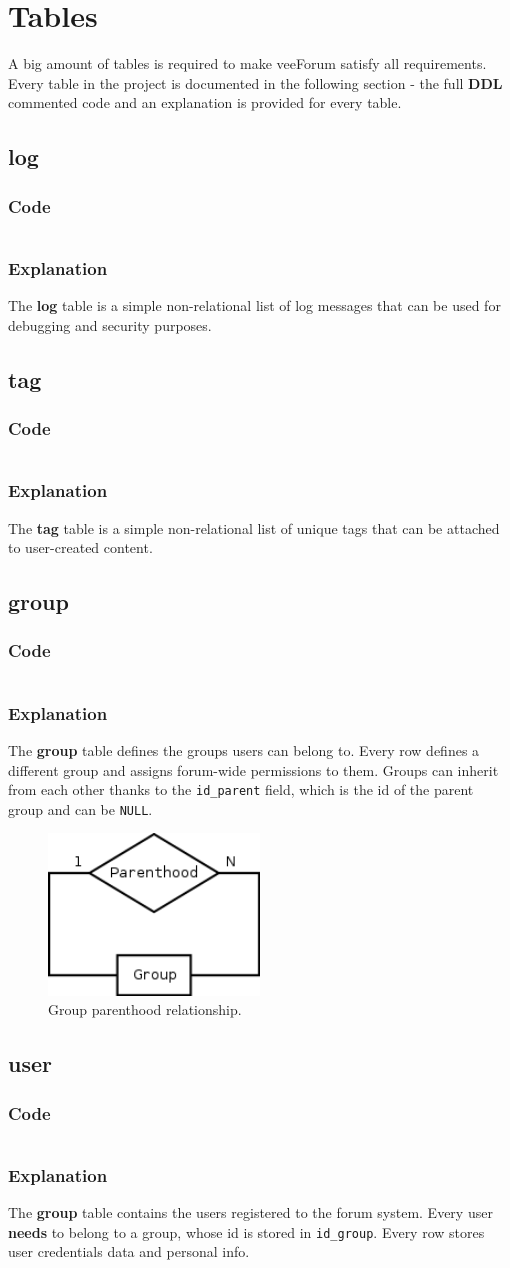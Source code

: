 \documentclass[12pt]{report}
\renewcommand\emph{\textbf}
\newcommand{\printSQLtest}[1]
{
    \inputminted[linenos, breaklines, breakbytoken, tabsize=4, fontsize=\footnotesize]{mysql}{#1}
}
\newcommand{\printSQLTablepage}[2]
{    
    \subsection{#2}
    \subsubsection{Code}
    \printSQLtest{../sql/parts/#1}
    \subsubsection{Explanation}
}
\begin{document}
            \section{Tables}

                A big amount of tables is required to make veeForum satisfy all requirements. Every table in the project is documented in the following section - the full \emph{DDL} commented code and an explanation is provided for every table.

                \printSQLTablepage{01_tblLog.sql}{log}
                    The \emph{log} table is a simple non-relational list of log messages that can be used for debugging and security purposes.

                \newpage

                \printSQLTablepage{02_tblTag.sql}{tag}
                    The \emph{tag} table is a simple non-relational list of unique tags that can be attached to user-created content.

                \newpage

                \printSQLTablepage{03_tblGroup.sql}{group}
                    The \emph{group} table defines the groups users can belong to. Every row defines a different group and assigns forum-wide permissions to them.
                    Groups can inherit from each other thanks to the \texttt{id_parent} field, which is the id of the parent group and can be \texttt{NULL}.

                    \begin{figure}[!htb]
                    \caption{Group parenthood relationship.}
                    \centering
                    \includegraphics[width=0.5\textwidth]{td/03group}
                    \end{figure}

                \newpage

                \printSQLTablepage{04_tblUser.sql}{user}
                    The \emph{group} table contains the users registered to the forum system. Every user \emph{needs} to belong to a group, whose id is stored in \texttt{id_group}.
                    Every row stores user credentials data and personal info.
\end{document}
